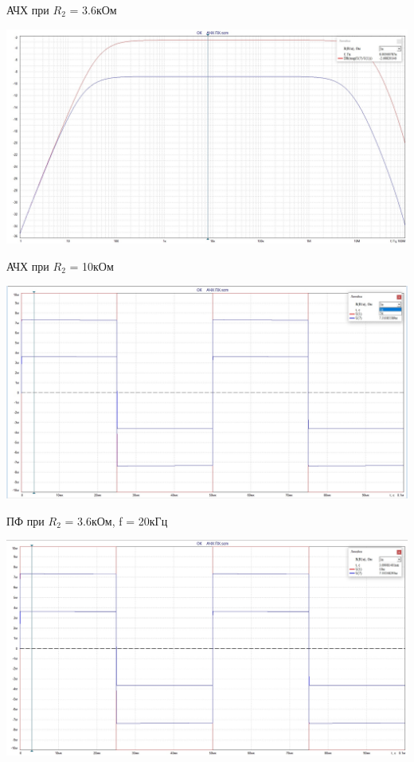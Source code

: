 \documentclass[a4paper,14pt]{extarticle}
\begin{document}
    АЧХ при $R_2$ = 3.6кОм

    \begin{center}
        \includegraphics[scale=0.3]{5.6.jpg}
    \end{center}

    АЧХ при $R_2$ = 10кОм

    \begin{center}
        \includegraphics[scale=0.3]{5.1.jpg}
    \end{center}

    ПФ при $R_2$ = 3.6кОм, f = 20кГц

    \begin{center}
        \includegraphics[scale=0.3]{5.2.jpg}
    \end{center}
\end{document}
